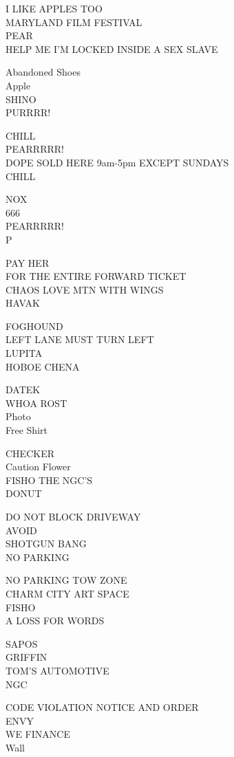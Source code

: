 \documentclass[10pt,letterpaper]{article}
\begin{document}
I LIKE APPLES TOO\\
MARYLAND FILM FESTIVAL\\
PEAR\\
HELP ME I'M LOCKED INSIDE A SEX SLAVE

Abandoned Shoes\\
Apple\\
SHINO\\
PURRRR!

CHILL\\
PEARRRRR!\\
DOPE SOLD HERE 9am{-}5pm EXCEPT SUNDAYS\\
CHILL

NOX\\
666\\
PEARRRRR!\\
P

PAY HER\\
FOR THE ENTIRE FORWARD TICKET\\
CHAOS LOVE MTN WITH WINGS\\
HAVAK

FOGHOUND\\
LEFT LANE MUST TURN LEFT\\
LUPITA\\
HOBOE CHENA

DATEK\\
WHOA ROST\\
Photo\\
Free Shirt

CHECKER\\
Caution Flower\\
FISHO THE NGC'S\\
DONUT

DO NOT BLOCK DRIVEWAY\\
AVOID\\
SHOTGUN BANG\\
NO PARKING

NO PARKING TOW ZONE\\
CHARM CITY ART SPACE\\
FISHO\\
A LOSS FOR WORDS

SAPOS\\
GRIFFIN\\
TOM'S AUTOMOTIVE\\
NGC

CODE VIOLATION NOTICE AND ORDER\\
ENVY\\
WE FINANCE\\
Wall
\end{document}
